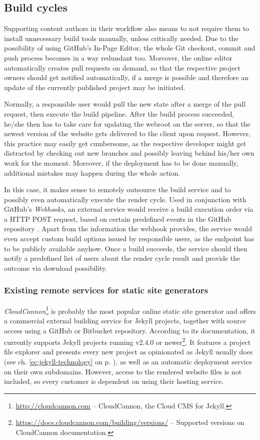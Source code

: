 \subsection{Build cycles}
\label{sec:solutions-remotebuilding}

Supporting content authors in their workflow also means to not require them to install unnecessary build tools manually, unless critically needed. Due to the possibility of using GitHub's In-Page Editor, the whole Git checkout, commit and push process becomes in a way redundant too. Moreover, the online editor automatically creates pull requests on demand, so that the respective project owners should get notified automatically, if a merge is possible and therefore an update of the currently published project may be initiated.

Normally, a responsible user would pull the new state after a merge of the pull request, then execute the build pipeline. After the build process succeeded, he/she then has to take care for updating the webroot on the server, so that the newest version of the website gets delivered to the client upon request. However, this practice may easily get cumbersome, as the respective developer might get distracted by checking out new branches and possibly leaving behind his/her own work for the moment. Moreover, if the deployment has to be done manually, additional mistakes may happen during the whole action.

In this case, it makes sense to remotely outsource the build service and to possibly even automatically execute the render cycle. Used in conjunction with GitHub's \emph{Webhooks}, an external service would receive a build execution order via a HTTP POST request, based on certain predefined events in the GitHub repository \cite{GithubWebhooks}. Apart from the information the webhook provides, the service would even accept custom build options issued by responsible users, as the endpoint has to be publicly available anyhow. Once a build succeeds, the service should then notify a predefined list of users about the render cycle result and provide the outcome via download possibility.

\subsubsection{Existing remote services for static site generators}
\emph{CloudCannon}\footnote{\url{http://cloudcannon.com} -- CloudCannon, the Cloud CMS for Jekyll.} is probably the most popular online static site generator and offers a commercial external building service for Jekyll projects, together with source access using a GitHub or Bitbucket repository. According to its documentation, it currently supports Jekyll projects running v2.4.0 or newer\footnote{\url{https://docs.cloudcannon.com/building/versions/} -- Supported versions on CloudCannon documentation.}. It features a project file explorer and presents every new project as opinionated as Jekyll usually does (see ch. \ref{ec:jekyll-technology} on p. \pageref{ec:jekyll-technology}), as well as an automatic deployment service on their own subdomains. However, access to the rendered website files is not included, so every customer is dependent on using their hosting service.

